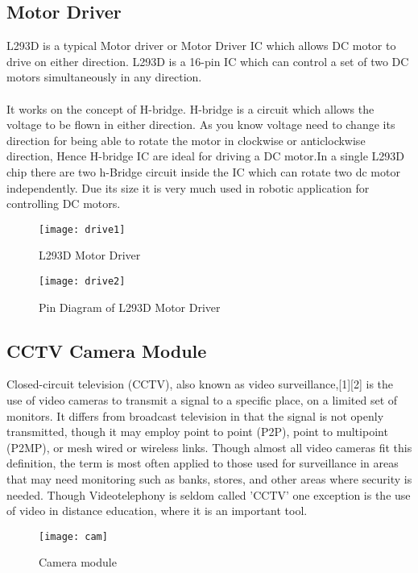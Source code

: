 \documentclass[12pt,a4paper]{report}
\begin{document}
\subsection{Motor Driver}

\hspace*{1cm} L293D is a typical Motor driver or Motor Driver IC which allows DC motor to drive on either direction. L293D is a 16-pin IC which can control a set of two DC motors simultaneously in any direction.\\\\
\hspace*{1cm}It works on the concept of H-bridge. H-bridge is a circuit which allows the voltage to be flown in either direction. As you know voltage need to change its direction for being able to rotate the motor in clockwise or anticlockwise direction, Hence H-bridge IC are ideal for driving a DC motor.In a single L293D chip there are two h-Bridge circuit inside the IC which can rotate two dc motor independently. Due its size it is very much used in robotic application for controlling DC motors.
\begin{figure}[h!]
\centering
\texttt{[image: drive1]}
\caption{L293D Motor Driver}
\label{circuit}
\end{figure}
\begin{figure}[h!]
\centering
\texttt{[image: drive2]}
\caption{Pin Diagram of L293D Motor Driver}
\label{circuit}
\end{figure}


\subsection{CCTV Camera Module}
\hspace*{1cm} Closed-circuit television (CCTV), also known as video surveillance,[1][2] is the use of video cameras to transmit a signal to a specific place, on a limited set of monitors. It differs from broadcast television in that the signal is not openly transmitted, though it may employ point to point (P2P), point to multipoint (P2MP), or mesh wired or wireless links. Though almost all video cameras fit this definition, the term is most often applied to those used for surveillance in areas that may need monitoring such as banks, stores, and other areas where security is needed. Though Videotelephony is seldom called 'CCTV' one exception is the use of video in distance education, where it is an important tool.
\begin{figure}[h!]
\centering
\texttt{[image: cam]}
\caption{Camera module}
\label{circuit}
\end{figure}
\end{document}
